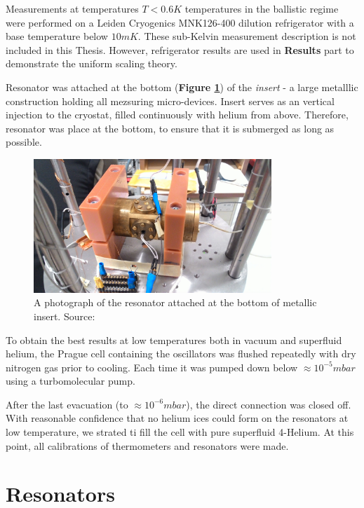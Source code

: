 \newpage

Measurements at temperatures $T < 0.6\unit{K}$ temperatures in the ballistic regime were performed on a Leiden Cryogenics MNK126-400 dilution refrigerator with a base temperature below $10 \unit{mK}$. These sub-Kelvin measurement description is not included in this Thesis. However, refrigerator results are used in \textbf{Results} part to demonstrate the uniform scaling theory.

Resonator was attached at the bottom (\textbf{Figure \ref{resonator}}) of the \textit{insert} - a large metalllic construction holding all mezsuring micro-devices. Insert serves as an vertical injection to the cryostat, filled continuously with helium from above. Therefore, resonator was place at the bottom, to ensure that it is submerged as long as possible.

\begin{figure}[h]
	\centering
	\includegraphics[width=0.8\textwidth]{graphics/exp/chamber}
	\caption{A photograph of the resonator attached at the bottom of metallic insert. Source: \cite{bakalaris}}
	\label{resonator}
\end{figure}

To obtain the best results at low temperatures both in vacuum and superfluid helium, the Prague cell containing the oscillators was flushed repeatedly with dry nitrogen gas prior to cooling. Each time it was pumped down below $\approx 10^{-5}\unit{mbar}$ using a turbomolecular pump.

After the last evacuation (to $\approx 10^{-6}\unit{mbar}$), the direct connection was closed off. With reasonable confidence that no helium ices could form on the resonators at low temperature, we strated ti fill the cell with pure superfluid 4-Helium. At this point, all calibrations of thermometers and resonators were made.


\newpage

\section{Resonators}

